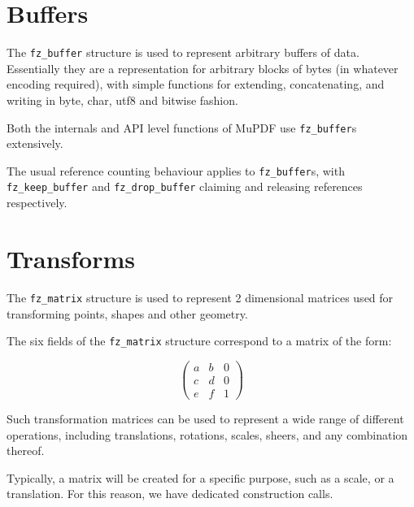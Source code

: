 \documentclass[oneside]{book}
\begin{document}
\section{Buffers}
\label{Buffers}

The \texttt{fz\_buffer} structure is used to represent arbitrary buffers of data. Essentially they are a representation for arbitrary blocks of bytes (in whatever encoding required), with simple functions  for extending, concatenating, and writing in byte, char, utf8 and bitwise fashion.

Both the internals and API level functions of MuPDF use \texttt{fz\_buffer}s extensively.

The usual reference counting behaviour applies to \texttt{fz\_buffer}s, with \texttt{fz\_keep\_buffer} and \texttt{fz\_drop\_buffer} claiming and releasing references respectively.

\section{Transforms}
\label{Transforms}

The \texttt{fz\_matrix} structure is used to represent 2 dimensional  matrices used for transforming points, shapes and other geometry.

The six fields of the \texttt{fz\_matrix} structure correspond to a matrix of the form:

\[ \left(
\begin{array}{ccc}
a & b & 0 \\
c & d & 0 \\
e & f & 1
\end{array}
\right) \]

Such transformation matrices can be used to represent a wide range of different operations, including translations, rotations, scales, sheers, and any combination thereof.

Typically, a matrix will be created for a specific purpose, such as a scale, or a translation. For this reason, we have dedicated construction calls.
\end{document}
